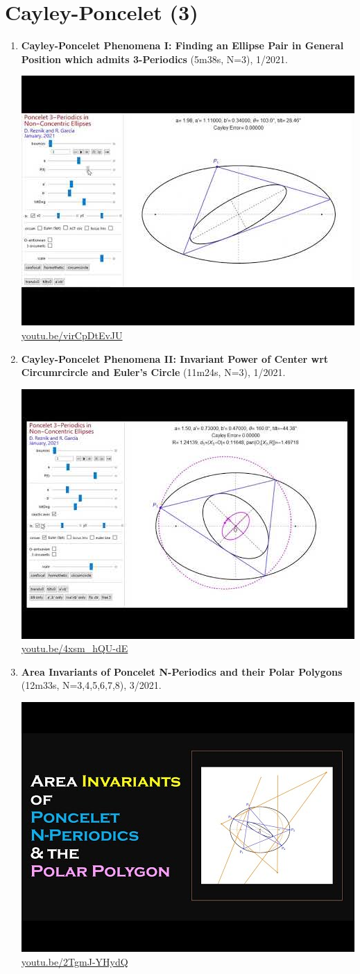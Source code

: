 \documentclass[12pt]{amsart}
\begin{document}
\section{Cayley-Poncelet (3)}

\begin{enumerate}[resume]
\item \textbf{Cayley-Poncelet Phenomena I: Finding an Ellipse Pair in General Position which admits 3-Periodics} (5m38s, N=3), 1/2021. 
\begin{center}\includegraphics[width=.5\textwidth]{pics/virCpDtEvJU.jpg} \\ 
\href{https://youtu.be/virCpDtEvJU}{\url{youtu.be/virCpDtEvJU}}\end{center}
% 
\item \textbf{Cayley-Poncelet Phenomena II: Invariant Power of Center wrt Circumrcircle and Euler's Circle} (11m24s, N=3), 1/2021. 
\begin{center}\includegraphics[width=.5\textwidth]{pics/4xsm_hQU-dE.jpg} \\ 
\href{https://youtu.be/4xsm_hQU-dE}{\url{youtu.be/4xsm\_hQU-dE}}\end{center}
% 
\item \textbf{Area Invariants of Poncelet N-Periodics and their Polar Polygons} (12m33s, N=3,4,5,6,7,8), 3/2021. 
\begin{center}\includegraphics[width=.5\textwidth]{pics/2TgmJ-YHydQ.jpg} \\ 
\href{https://youtu.be/2TgmJ-YHydQ}{\url{youtu.be/2TgmJ-YHydQ}}\end{center}
% 
\end{enumerate}
\end{document}

